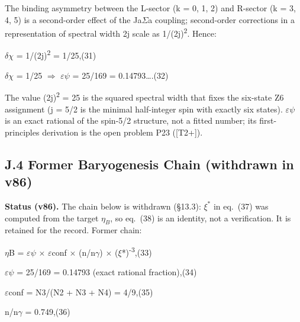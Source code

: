 \documentclass[11pt,letterpaper]{article}
\begin{document}
\noindent The binding asymmetry between the L-sector (k = 0, 1, 2) and R-sector (k = 3, 4, 5) is a second-order effect of the Ja$\Sigma$a coupling; second-order corrections in a representation of spectral width 2j scale as 1/(2j)\textsuperscript{2}. Hence:

\begingroup\centering $\delta$$\chi$ = 1/(2j)\textsuperscript{2} = 1/25,\hspace{2em}(31)\par\endgroup

\begingroup\centering $\delta$$\chi$ = 1/25  $\Rightarrow$  $\varepsilon$$\psi$ = 25/169 = 0.14793\ldots{}.\hspace{2em}(32)\par\endgroup

\noindent The value (2j)\textsuperscript{2} = 25 is the squared spectral width that fixes the six-state Z6 assignment (j = 5/2 is the minimal half-integer spin with exactly six states). $\varepsilon$$\psi$ is an exact rational of the spin-5/2 structure, not a fitted number; its first-principles derivation is the open problem P23 ([T2+]).

\subsection*{J.4  Former Baryogenesis Chain (withdrawn in v86)}

\noindent \textbf{Status (v86). }The chain below is withdrawn (§13.3): $\xi^*$ in eq.~(37) was computed from the target $\eta_B$, so eq.~(38) is an identity, not a verification. It is retained for the record. Former chain:

\begingroup\centering $\eta$B = $\varepsilon$$\psi$ $\times$ $\varepsilon$conf $\times$ (n/n$\gamma$) $\times$ ($\xi$*)\textsuperscript{-3},\hspace{2em}(33)\par\endgroup

\begingroup\centering $\varepsilon$$\psi$ = 25/169 = 0.14793  (exact rational fraction),\hspace{2em}(34)\par\endgroup

\begingroup\centering $\varepsilon$conf = N3/(N2 + N3 + N4) = 4/9,\hspace{2em}(35)\par\endgroup

\begingroup\centering n/n$\gamma$ = 0.749,\hspace{2em}(36)\par\endgroup
\end{document}
